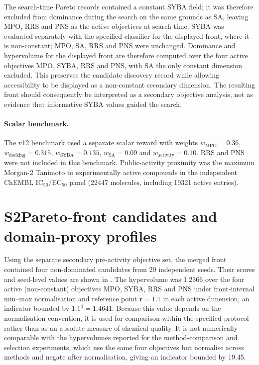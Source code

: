 \documentclass[10pt,a4paper]{article}
\begin{document}
The search-time Pareto records contained a constant SYBA field; it was
therefore excluded from dominance during the search on the same
grounds as SA, leaving MPO, RRS and PNS as the active objectives at search
time. SYBA was evaluated separately with the specified classifier for the
displayed front, where it is non-constant; MPO, SA, RRS and PNS were unchanged.
Dominance and hypervolume for the displayed front are therefore computed over
the four active objectives MPO, SYBA, RRS and PNS, with SA the only constant
dimension excluded. This preserves the candidate discovery
record while allowing accessibility to be displayed as a non-constant secondary
dimension. The resulting front should consequently be interpreted as a secondary
objective analysis, not as evidence that informative SYBA values guided the search.

\paragraph{Scalar benchmark.}
The v12 benchmark used a separate scalar reward with weights
$w_{\mathrm{MPO}}=\num{0.36}$, $w_{\mathrm{docking}}=\num{0.315}$,
$w_{\mathrm{SYBA}}=\num{0.135}$, $w_{\mathrm{SA}}=\num{0.09}$ and
$w_{\mathrm{activity}}=\num{0.10}$. RRS and PNS were not included in this
benchmark. Public-activity proximity was the maximum Morgan-2 Tanimoto to
experimentally active compounds in the independent ChEMBL IC$_{50}$/EC$_{50}$
panel (\num{22447} molecules, including \num{19321} active entries).

\section*{S2\hspace{0.6em}Pareto-front candidates and domain-proxy profiles}

Using the separate secondary pre-activity objective set, the merged front contained four non-dominated candidates from
\num{20} independent seeds. Their scores and seed-level values are shown
in . The hypervolume was \num{1.2366} over the four active
(non-constant) objectives MPO, SYBA, RRS and PNS under front-internal min--max
normalisation and reference point
$\mathbf{r}=\num{1.1}$ in each active dimension, an indicator bounded by $1.1^{4}=\num{1.4641}$. Because this value
depends on the normalisation convention, it is used for comparison within the
specified protocol rather than as an absolute measure of chemical quality. It is
not numerically comparable with the hypervolumes reported for the
method-comparison and selection experiments, which use the same four objectives
but normalise across methods and negate after normalisation, giving an indicator
bounded by \num{19.45}.
\end{document}
